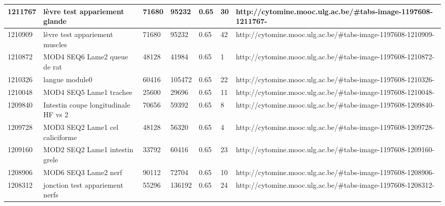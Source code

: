 \documentclass[a4paper,11pt]{report}
\numberwithin{figure}{chapter} %
\begin{document}
\begin{table}[]
{\begin{tabular}{|l|l|l|l|l|l|l|}
1211767  & l\`{e}vre test appariement glande                                                                & 71680  & 95232  & 0.65                  & 30          & http://cytomine.mooc.ulg.ac.be/\#tabs-image-1197608-1211767-  \\ \hline
1210909  & l\`{e}vre test appariement muscles                                                               & 71680  & 95232  & 0.65                  & 42          & http://cytomine.mooc.ulg.ac.be/\#tabs-image-1197608-1210909-  \\ \hline
1210872  & MOD4 SEQ6 Lame2 queue de rat                                                                 & 48128  & 41984  & 0.65                  & 1           & http://cytomine.mooc.ulg.ac.be/\#tabs-image-1197608-1210872-  \\ \hline
1210326  & langue module0                                                                               & 60416  & 105472 & 0.65                  & 22          & http://cytomine.mooc.ulg.ac.be/\#tabs-image-1197608-1210326-  \\ \hline
1210048  & MOD4 SEQ5 Lame1 trachee                                                                      & 25600  & 29696  & 0.65                  & 11          & http://cytomine.mooc.ulg.ac.be/\#tabs-image-1197608-1210048-  \\ \hline
1209840  & Intestin coupe longitudinale HF vs 2                                                         & 70656  & 59392  & 0.65                  & 8           & http://cytomine.mooc.ulg.ac.be/\#tabs-image-1197608-1209840-  \\ \hline
1209728  & MOD3 SEQ2 Lame1 cel caliciforme                                                              & 48128  & 56320  & 0.65                  & 4           & http://cytomine.mooc.ulg.ac.be/\#tabs-image-1197608-1209728-  \\ \hline
1209160  & MOD2 SEQ2 Lame1 intestin grele                                                               & 33792  & 60416  & 0.65                  & 23          & http://cytomine.mooc.ulg.ac.be/\#tabs-image-1197608-1209160-  \\ \hline
1208906  & MOD6 SEQ3 Lame2 nerf                                                                         & 90112  & 72704  & 0.65                  & 10          & http://cytomine.mooc.ulg.ac.be/\#tabs-image-1197608-1208906-  \\ \hline
1208312  & jonction test appariement nerfs                                                              & 55296  & 136192 & 0.65                  & 24          & http://cytomine.mooc.ulg.ac.be/\#tabs-image-1197608-1208312-  \\ \hline

\end{tabular}}
\end{table}
\end{document}
